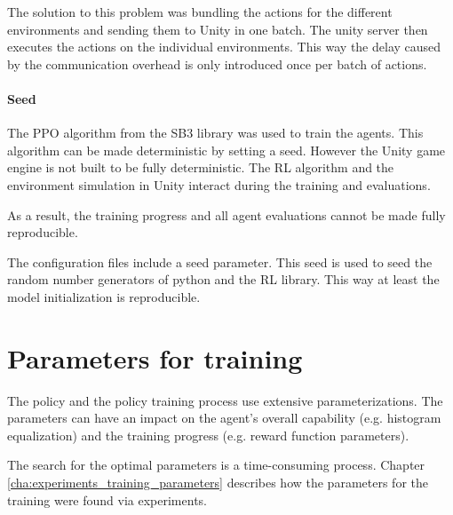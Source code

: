 The solution to this problem was bundling the actions for the different environments and sending them to Unity in one batch. The unity server then executes the actions on the individual environments. This way the delay caused by the communication overhead is only introduced once per batch of actions.

\paragraph{Seed}

The \ac{PPO} algorithm from the \ac{SB3} library was used to train the agents. This algorithm can be made deterministic by setting a seed. However the Unity game engine is not built to be fully deterministic. The \ac{RL} algorithm and the environment simulation in Unity interact during the training and evaluations. 

As a result, the training progress and all agent evaluations cannot be made fully reproducible.

The configuration files include a seed parameter. This seed is used to seed the random number generators of python and the \ac{RL} library. This way at least the model initialization is reproducible.

\section{Parameters for training}

The policy and the policy training process use extensive parameterizations. The parameters can have an impact on the agent's overall capability (e.g. histogram equalization) and the training progress (e.g. reward function parameters).

The search for the optimal parameters is a time-consuming process. Chapter \ref{cha:experiments_training_parameters} describes how the parameters for the training were found via experiments.

